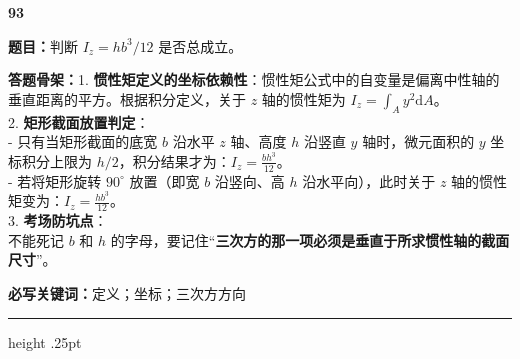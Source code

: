 \documentclass[a4paper,10pt]{article}
\newcommand{\qitem}[5]{%
\Needspace{6\baselineskip}
\vspace{3pt}
{\Large\bfseries\color{deep} #1}\quad{\bfseries\color{orangea}#2}\par
\textbf{题目：}#3\par
\textbf{答题骨架：}#4\par
\textbf{必写关键词：}{\color{bluea}#5}\par
\vspace{2pt}\hrule height .25pt
}
\begin{document}
\qitem{93}{惯性矩轴错误}
{判断 \(I_z=hb^3/12\) 是否总成立。}
{1. \textbf{惯性矩定义的坐标依赖性}：惯性矩公式中的自变量是偏离中性轴的垂直距离的平方。根据积分定义，关于 \(z\) 轴的惯性矩为 \(I_z = \int_A y^2 \mathrm{d}A\)。\\
2. \textbf{矩形截面放置判定}：\\
   - 只有当矩形截面的底宽 \(b\) 沿水平 \(z\) 轴、高度 \(h\) 沿竖直 \(y\) 轴时，微元面积的 \(y\) 坐标积分上限为 \(h/2\)，积分结果才为：\(I_z = \frac{b h^3}{12}\)。\\
   - 若将矩形旋转 \(90^\circ\) 放置（即宽 \(b\) 沿竖向、高 \(h\) 沿水平向），此时关于 \(z\) 轴的惯性矩变为：\(I_z = \frac{h b^3}{12}\)。\\
3. \textbf{考场防坑点}：\\
   不能死记 \(b\) 和 \(h\) 的字母，要记住“\textbf{三次方的那一项必须是垂直于所求惯性轴的截面尺寸}”。}
{定义；坐标；三次方方向}
\end{document}
